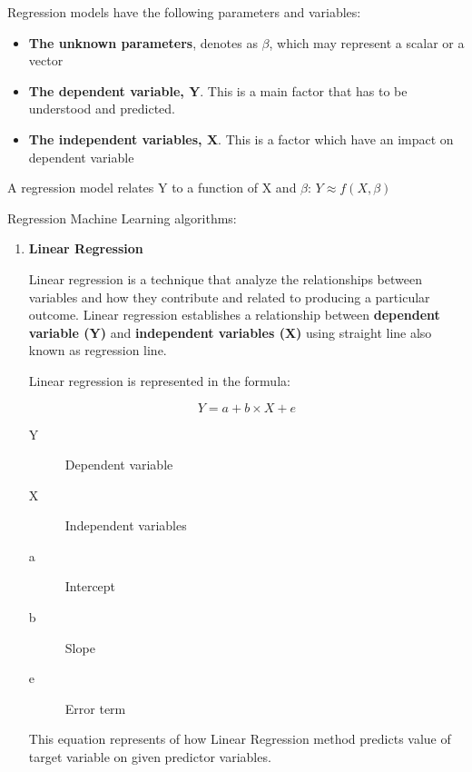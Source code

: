 Regression models have the following parameters and variables:

\begin{itemize}
    \item \textbf{The unknown parameters}, denotes as $\beta$, which may represent a scalar or a vector
    \item \textbf{The dependent variable, Y}. This is a main factor that has to be understood and predicted.
    \item \textbf{The independent variables, X}. This is a factor which have an impact on dependent variable
\end{itemize}
A regression model relates Y to a function of X and $\beta$: $Y \approx f(X, \beta)$


Regression Machine Learning algorithms:
\begin{enumerate}
    \item \textbf{Linear Regression}
    
    Linear regression \cite{BIB6} is a technique that analyze the relationships between variables and how they contribute and related to producing a particular outcome. Linear regression establishes a relationship between \textbf{dependent variable (Y)} and \textbf{independent variables (X)} using straight line also known as regression line. 
    
    Linear regression is represented in the formula:
    
    \begin{equation}
     Y = a + b\times X + e
    \end{equation}
    \begin{description}
        \item[Y] Dependent variable 
        \item[X] Independent variables
        \item[a] Intercept
        \item[b] Slope
        \item[e] Error term
    \end{description}
    This equation represents of how Linear Regression method predicts value of target variable on given predictor variables.
    

\end{enumerate}
